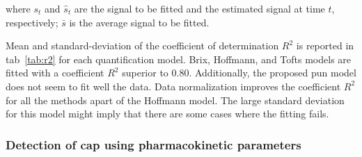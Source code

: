 \noindent where $s_t$ and $\hat{s}_t$ are the signal to be fitted and the estimated signal at time $t$, respectively; $\bar{s}$ is the average signal to be fitted.

Mean and standard-deviation of the coefficient of determination $R^{2}$ is reported in \acs{tab}~\ref{tab:r2} for each quantification model.
Brix, Hoffmann, and Tofts models are fitted with a coefficient $R^{2}$ superior to 0.80.
Additionally, the proposed \ac{pun} model does not seem to fit well the data.
Data normalization improves the coefficient $R^2$ for all the methods apart of the Hoffmann model.
The large standard deviation for this model might imply that there are some cases where the fitting fails.

\subsubsection{Detection of \acs*{cap} using pharmacokinetic parameters}\label{subsubsec:chp5:DCE-norm:phar}

